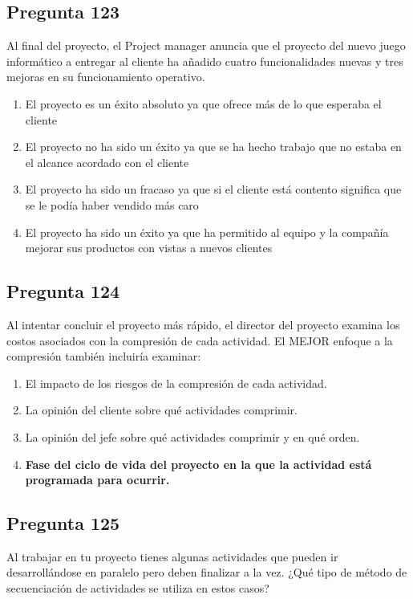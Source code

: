 \documentclass[11pt,a4paper]{article}
\begin{document}
\subsection*{Pregunta 123}
Al final del proyecto, el Project manager anuncia que el proyecto del nuevo juego informático a entregar al cliente ha añadido cuatro funcionalidades nuevas y tres mejoras en su funcionamiento operativo.

\begin{enumerate}[label=\alph*)]
  \item El proyecto es un éxito absoluto ya que ofrece más de lo que esperaba el cliente
  \item El proyecto no ha sido un éxito ya que se ha hecho trabajo que no estaba en el alcance acordado con el cliente
  \item El proyecto ha sido un fracaso ya que si el cliente está contento significa que se le podía haber vendido más caro
  \item El proyecto ha sido un éxito ya que ha permitido al equipo y la compañía mejorar sus productos con vistas a nuevos clientes
\end{enumerate}

\subsection*{Pregunta 124}
Al intentar concluir el proyecto más rápido, el director del proyecto examina los costos asociados con la compresión de cada actividad. El MEJOR enfoque a la compresión también incluiría examinar:

\begin{enumerate}[label=\alph*)]
  \item El impacto de los riesgos de la compresión de cada actividad.
  \item La opinión del cliente sobre qué actividades comprimir.
  \item La opinión del jefe sobre qué actividades comprimir y en qué orden.
  \item \textbf{Fase del ciclo de vida del proyecto en la que la actividad está programada para ocurrir.}
\end{enumerate}

\subsection*{Pregunta 125}
Al trabajar en tu proyecto tienes algunas actividades que pueden ir desarrollándose en paralelo pero deben finalizar a la vez. ¿Qué tipo de método de secuenciación de actividades se utiliza en estos casos?
\end{document}
